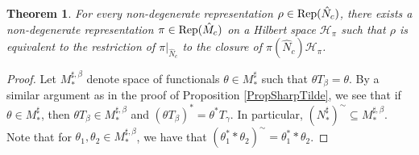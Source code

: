 \documentclass[pdftex]{sigma}
\numberwithin{equation}{section}
\newtheorem{thm}{Theorem}[section]
\theoremstyle{definition}
\newcommand{\Rep}{\text{\rm Rep}}
\newcommand{\cHil}{\mathcal{H}}
\begin{document}
\begin{thm}\label{ThmCorrespondenceC}
For every non-degenerate representation $\rho \in \Rep(\hat{N}_c)$, there exists a non-degenerate representation $\pi \in \Rep(\hat{M}_c)$ on a Hilbert space $\cHil_\pi$ such that $\rho$ is equivalent to the restriction of $\pi\vert_{\hat{N}_c}$ to the closure of $\pi(\hat{N}_c) \cHil_{\pi}$.
\end{thm}
  \begin{proof}
Let $M_\ast^{\sharp,\beta}$ denote space of functionals $\theta \in M_\ast^\sharp$ such that $\theta T_\beta = \theta$. By a similar argument as in the proof of Proposition \ref{PropSharpTilde}, we see that if $\theta \in M_\ast^\sharp$, then $\theta T_\beta \in M_\ast^{\sharp, \beta}$ and $(\theta T_\beta)^\ast = \theta^\ast T_\gamma$.  In particular, $(N_\ast^\sharp)^\sim \subseteq M_\ast^{\sharp,\beta}$. Note that for $\theta_1, \theta_2 \in  M_\ast^{\sharp, \beta}$, we have that $(\theta_1^\ast \ast \theta_2)^\sim = \theta_1^\ast \ast \theta_2$.



\end{proof}
\end{document}
